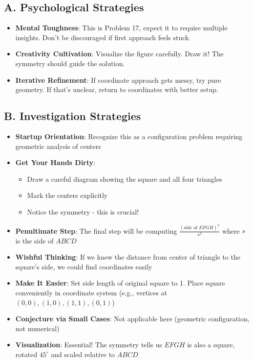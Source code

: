 \documentclass[]{article}
\begin{document}
\begin{strategicbox}
\subsection*{A. Psychological Strategies}
\begin{itemize}[leftmargin=*]
    \item \textbf{Mental Toughness}: This is Problem 17, expect it to require multiple insights. Don't be discouraged if first approach feels stuck.
    \item \textbf{Creativity Cultivation}: Visualize the figure carefully. Draw it! The symmetry should guide the solution.
    \item \textbf{Iterative Refinement}: If coordinate approach gets messy, try pure geometry. If that's unclear, return to coordinates with better setup.
\end{itemize}

\subsection*{B. Investigation Strategies}
\begin{itemize}[leftmargin=*]
    \item \textbf{Startup Orientation}: Recognize this as a configuration problem requiring geometric analysis of centers
    \item \textbf{Get Your Hands Dirty}: 
    \begin{itemize}
        \item Draw a careful diagram showing the square and all four triangles
        \item Mark the centers explicitly
        \item Notice the symmetry - this is crucial!
    \end{itemize}
    \item \textbf{Penultimate Step}: The final step will be computing $\frac{(\text{side of } EFGH)^2}{s^2}$ where $s$ is the side of $ABCD$
    \item \textbf{Wishful Thinking}: If we knew the distance from center of triangle to the square's side, we could find coordinates easily
    \item \textbf{Make It Easier}: Set side length of original square to 1. Place square conveniently in coordinate system (e.g., vertices at $(0,0), (1,0), (1,1), (0,1)$)
    \item \textbf{Conjecture via Small Cases}: Not applicable here (geometric configuration, not numerical)
    \item \textbf{Visualization}: Essential! The symmetry tells us $EFGH$ is also a square, rotated $45^\circ$ and scaled relative to $ABCD$
\end{itemize}


\end{strategicbox}
\end{document}
